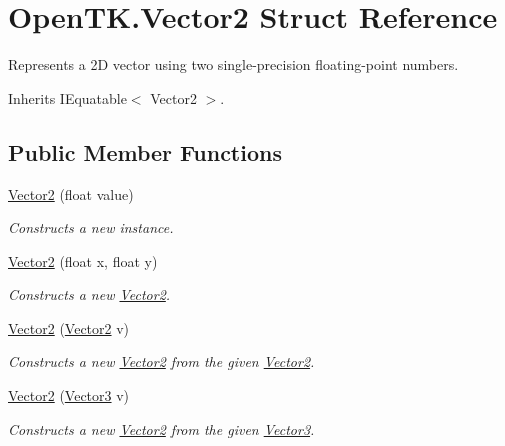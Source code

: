 \hypertarget{struct_open_t_k_1_1_vector2}{\section{Open\-T\-K.\-Vector2 Struct Reference}
\label{struct_open_t_k_1_1_vector2}
}


Represents a 2\-D vector using two single-\/precision floating-\/point numbers. 




Inherits I\-Equatable$<$ Vector2 $>$.

\subsection*{Public Member Functions}
\begin{DoxyCompactItemize}
\item 
\hyperlink{struct_open_t_k_1_1_vector2_a53943eae3024e0d8ebfd7fc3df5be3a1}{Vector2} (float value)
\begin{DoxyCompactList}\small\item\em Constructs a new instance. \end{DoxyCompactList}\item 
\hyperlink{struct_open_t_k_1_1_vector2_a30b6efc6ac0abd4cd7355e7d615eed6a}{Vector2} (float x, float y)
\begin{DoxyCompactList}\small\item\em Constructs a new \hyperlink{struct_open_t_k_1_1_vector2}{Vector2}. \end{DoxyCompactList}\item 
\hyperlink{struct_open_t_k_1_1_vector2_acac2d82baff29a0933a774b805caa760}{Vector2} (\hyperlink{struct_open_t_k_1_1_vector2}{Vector2} v)
\begin{DoxyCompactList}\small\item\em Constructs a new \hyperlink{struct_open_t_k_1_1_vector2}{Vector2} from the given \hyperlink{struct_open_t_k_1_1_vector2}{Vector2}. \end{DoxyCompactList}\item 
\hyperlink{struct_open_t_k_1_1_vector2_aa47606521cea5a6b447f5414668c3276}{Vector2} (\hyperlink{struct_open_t_k_1_1_vector3}{Vector3} v)
\begin{DoxyCompactList}\small\item\em Constructs a new \hyperlink{struct_open_t_k_1_1_vector2}{Vector2} from the given \hyperlink{struct_open_t_k_1_1_vector3}{Vector3}. \end{DoxyCompactList}\item 

\end{DoxyCompactItemize}
